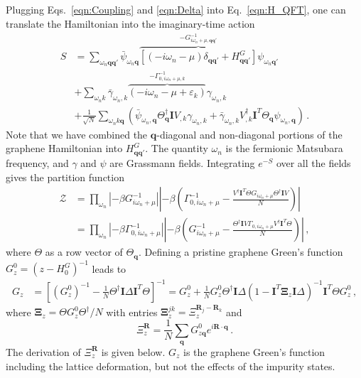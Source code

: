 \documentclass[aps, prb, superscriptaddress, preprint, floatfix]{revtex4-1}
\begin{document}
Plugging Eqs.~\eqref{eqn:Coupling} and \eqref{eqn:Delta} into Eq.~\eqref{eqn:H_QFT}, one can translate the Hamiltonian into the imaginary-time action
%
\begin{align}
    S &= \sum_{\omega_n\mathbf{qq}'} \bar\psi_{\omega_n\mathbf{q}}
    \overbrace{
    \left[\left(-i\omega_n-\mu\right) \delta_{\mathbf{qq}'}
    + 
    H^G_{\mathbf{qq}'} \right]}^{-G^{-1}_{i\omega_n + \mu, \mathbf{qq}'}}
    \psi_{\omega_n\mathbf{q}'}
    \nonumber
    \\
    &
    +
    \sum_{\omega_n k}\bar\gamma_{\omega_n,k} 
    \overbrace{\left(-i\omega_n - \mu + \varepsilon_k \right)}^{-\Gamma_{0,i\omega_n + \mu, k}^{-1}} \gamma_{\omega_n,k}
    \nonumber
    \\
    &
    +
    \frac{1}{\sqrt{N}}\sum_{\omega_n k \mathbf{q}} 
    \left(
    \bar\psi_{\omega_n,\mathbf{q}}
    \Theta_\mathbf{q}^\dagger
    \mathbf{I}V_{,k}
    \gamma_{\omega_n,k}+
    \bar\gamma_{\omega_n,k} 
    V_{,k}^\dagger\mathbf{I}^T\Theta_\mathbf{q}
    \psi_{\omega_n,\mathbf{q}}
    \right)\,.
    \label{eqn:S}
\end{align}
%
Note that we have combined the $\mathbf{q}$-diagonal and non-diagonal portions of the graphene Hamiltonian into $ H^G_{\mathbf{qq}'}$. The quantity $\omega_n$ is the fermionic Matsubara frequency, and $\gamma$ and $\psi$ are Grassmann fields. Integrating $e^{-S}$ over all the fields gives the partition function
%
\begin{align}
    \mathcal{Z} &= 
    \prod_{\omega_n }
    \left|-\beta G^{-1}_{i\omega_n+\mu}\right|
    \left|-\beta\left(\Gamma^{-1}_{0,i\omega_n+\mu} - \frac{V^\dagger \mathbf{I}^T\Theta  G_{i\omega_n+\mu} \Theta^\dagger \mathbf{I} V}{N}\right)\right|
    \nonumber
    \\
    &= 
    \prod_{\omega_n }
    \left|-\beta \Gamma^{-1}_{0,i\omega_n+\mu}\right|
    \left|-\beta\left( G_{i\omega_n+\mu} ^{-1} -  \frac{\Theta^\dagger\mathbf{I}V\Gamma_{0,i\omega_n+\mu}V^\dagger \mathbf{I}^T\Theta  }{N}\right)\right|\,,
    \label{eqn:Z}
\end{align}
%
where $\Theta$ as a row vector of $\Theta_\mathbf{q}$. Defining a pristine graphene Green's function $G_{z}^0 = \left(z - H^G_0\right)^{-1}$ leads to
%
\begin{align}
	G_{z} &= \left[\left(G_{z}^0\right)^{-1} - \frac{1}{N} \Theta^\dagger\mathbf{I}\Delta \mathbf{I}^T\Theta\right]^{-1}
	=
	G_{z}^0
	+
	\frac{1}{N} G_{z}^0\Theta^\dagger\mathbf{I}\Delta
	\left( 1
	-
	\mathbf{I}^T\boldsymbol{\Xi}_{z}\mathbf{I}\Delta 
	\right)^{-1}\mathbf{I}^T\Theta G_{z}^0\,,	
\end{align}
%
where $\boldsymbol{\Xi}_{z} = \Theta G_{z}^0\Theta^\dagger / N$ with entries $\boldsymbol{\Xi}_{z}^{jk} = \Xi_{z}^{\mathbf{R}_j - \mathbf{R}_k}$ and
%
\begin{equation}
    \Xi_z^\mathbf{R} = \frac{1}{N}\sum_\mathbf{q}G_{z\mathbf{q}}^0
    e^{i \mathbf{R} \cdot\mathbf{q}}\,.
    \label{eqn:Xi}
\end{equation}
%
The derivation of $\Xi_z^\mathbf{R}$ is given below. $G_z$ is the graphene Green's function including the lattice deformation, but not the effects of the impurity states.
\end{document}
